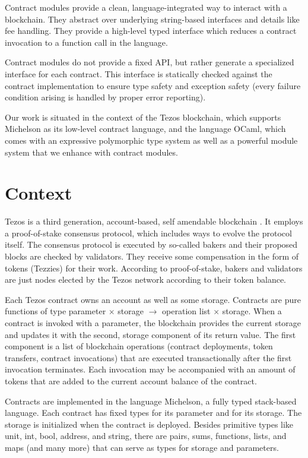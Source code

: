 \documentclass[a4paper,USenglish,american,cleveref, autoref, thm-restate]{oasics-v2021}
\begin{document}
Contract modules provide a clean, language-integrated way to interact
with a blockchain. They abstract over underlying string-based
interfaces and details like fee handling. They provide a high-level
typed interface which reduces a contract invocation to a function call
in the language.

Contract modules do not provide a fixed API, but
rather generate a specialized interface for each contract. This
interface is statically checked against the contract implementation to
ensure type safety and exception safety (every failure condition
arising is handled by proper error reporting).

Our work is situated in the context of the Tezos blockchain, which
supports Michelson as its low-level contract language, and the
language OCaml, which comes with an expressive polymorphic type system
as well as a powerful module system that we
enhance with contract modules. 

\section{Context}
\label{sec:context}

Tezos is a third generation, account-based, self amendable
blockchain \cite{tezos-whitepaper}. It employs a proof-of-stake consensus protocol, which
includes ways to evolve the protocol itself. The consensus protocol is
executed by so-called bakers and their proposed blocks are checked by
validators. They receive some compensation in the form of
tokens (Tezzies) for their work. According to proof-of-stake,
bakers and validators are just nodes elected by the Tezos network
according to their token balance. 

Each Tezos contract owns an account as well as some storage. Contracts
are pure functions of type parameter $\times$ storage $\to$ operation
list $\times$ storage. When a contract is invoked with a parameter,
the blockchain provides the current storage and updates it with the
second, storage component of its return value. The first component is
a list of blockchain operations (contract deployments, token
transfers, contract invocations) that are executed transactionally
after the first invocation terminates. Each invocation may be
accompanied with an amount of tokens that are added to the current
account balance of the contract.

Contracts are implemented in the language Michelson, a fully typed
stack-based language. Each contract has fixed types for its parameter
and for its storage. The storage is initialized when the contract is
deployed. Besides primitive types like unit, int, bool, address, and string,
there are pairs, sums, functions, lists, and maps (and many more) that
can serve as types for storage and parameters.
\end{document}
